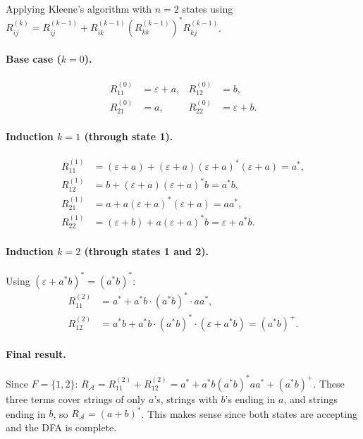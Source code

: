 \documentclass{article}
\theoremstyle{theorem}
\theoremstyle{definition}
\theoremstyle{remark}
\begin{document}
Applying Kleene's algorithm with $n = 2$ states using $R^{(k)}_{ij} = R^{(k-1)}_{ij} + R^{(k-1)}_{ik}(R^{(k-1)}_{kk})^* R^{(k-1)}_{kj}$.

\paragraph{Base case ($k = 0$).}
\begin{align*}
  R^{(0)}_{11} &= \varepsilon + a, &
  R^{(0)}_{12} &= b, \\
  R^{(0)}_{21} &= a, &
  R^{(0)}_{22} &= \varepsilon + b.
\end{align*}

\paragraph{Induction $k = 1$ (through state 1).}
\begin{align*}
  R^{(1)}_{11}
    &= (\varepsilon + a) + (\varepsilon + a)(\varepsilon + a)^*(\varepsilon + a)
    = a^*, \\
  R^{(1)}_{12}
    &= b + (\varepsilon + a)(\varepsilon + a)^* b
    = a^* b, \\
  R^{(1)}_{21}
    &= a + a(\varepsilon + a)^*(\varepsilon + a)
    = aa^*, \\
  R^{(1)}_{22}
    &= (\varepsilon + b) + a(\varepsilon + a)^* b
    = \varepsilon + a^* b.
\end{align*}

\paragraph{Induction $k = 2$ (through states 1 and 2).}
Using $(\varepsilon + a^*b)^* = (a^*b)^*$:
\begin{align*}
  R^{(2)}_{11}
    &= a^* + a^* b \cdot (a^* b)^* \cdot aa^*, \\
  R^{(2)}_{12}
    &= a^* b + a^* b \cdot (a^* b)^* \cdot (\varepsilon + a^* b)
    = (a^* b)^+.
\end{align*}

\paragraph{Final result.}
Since $F = \{1, 2\}$: $R_{\mathcal{A}} = R^{(2)}_{11} + R^{(2)}_{12} = a^* + a^*b(a^*b)^*aa^* + (a^*b)^+$. These three terms cover strings of only $a$'s, strings with $b$'s ending in $a$, and strings ending in $b$, so $R_{\mathcal{A}} = (a + b)^*$. This makes sense since both states are accepting and the DFA is complete.
\end{document}
